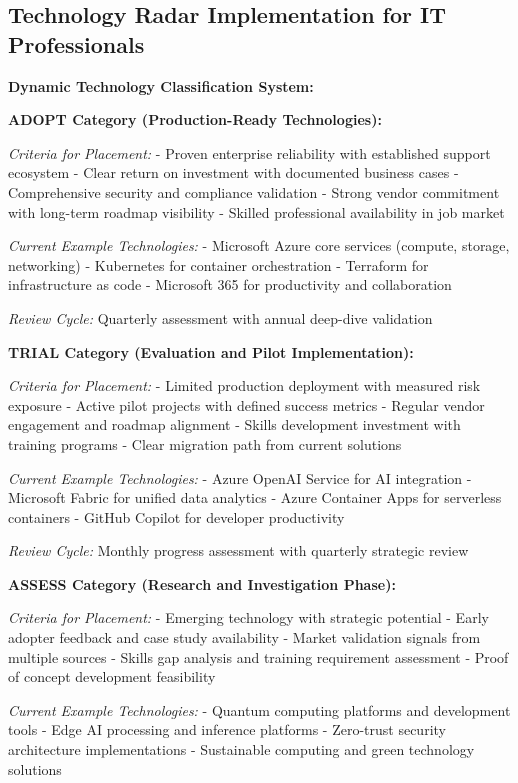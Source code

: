 \documentclass[
  letterpaper,
  DIV=11,
  numbers=noendperiod]{scrartcl}
\begin{document}
\subsection{Technology Radar Implementation for IT
Professionals}\label{technology-radar-implementation-for-it-professionals}

\textbf{Dynamic Technology Classification System:}

\textbf{ADOPT Category (Production-Ready Technologies):}

\emph{Criteria for Placement:} - Proven enterprise reliability with
established support ecosystem - Clear return on investment with
documented business cases - Comprehensive security and compliance
validation - Strong vendor commitment with long-term roadmap visibility
- Skilled professional availability in job market

\emph{Current Example Technologies:} - Microsoft Azure core services
(compute, storage, networking) - Kubernetes for container orchestration
- Terraform for infrastructure as code - Microsoft 365 for productivity
and collaboration

\emph{Review Cycle:} Quarterly assessment with annual deep-dive
validation

\textbf{TRIAL Category (Evaluation and Pilot Implementation):}

\emph{Criteria for Placement:} - Limited production deployment with
measured risk exposure - Active pilot projects with defined success
metrics - Regular vendor engagement and roadmap alignment - Skills
development investment with training programs - Clear migration path
from current solutions

\emph{Current Example Technologies:} - Azure OpenAI Service for AI
integration - Microsoft Fabric for unified data analytics - Azure
Container Apps for serverless containers - GitHub Copilot for developer
productivity

\emph{Review Cycle:} Monthly progress assessment with quarterly
strategic review

\textbf{ASSESS Category (Research and Investigation Phase):}

\emph{Criteria for Placement:} - Emerging technology with strategic
potential - Early adopter feedback and case study availability - Market
validation signals from multiple sources - Skills gap analysis and
training requirement assessment - Proof of concept development
feasibility

\emph{Current Example Technologies:} - Quantum computing platforms and
development tools - Edge AI processing and inference platforms -
Zero-trust security architecture implementations - Sustainable computing
and green technology solutions
\end{document}
